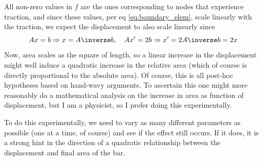 \documentclass[sigconf]{acmart}
\begin{document}
All non-zero values in $ f $ are the ones corresponding to nodes that experience traction, and since these values, per eq \ref{eq:boundary_elem}, scale linearly with the traction, we expect the displacement to also scale linearly since
\begin{equation*}\label{key}
	Ax=b \Rightarrow x = A\inverse b, \quad Ax' = 2b \Rightarrow x'=2A\inverse b = 2x
\end{equation*}
Now, area scales as the square of length, so a linear increase in the displacement might well induce a quadratic increase in the relative area (which of course is directly proportional to the absolute area). Of course, this is all post-hoc hypotheses based on hand-wavy arguments. To ascertain this one might more reasonably do a mathematical analysis on the increase in area as function of displacement, but I am a physicist, so I prefer doing this experimentally.

To do this experimentally, we need to vary as many different parameters as possible (one at a time, of course) and see if the effect still occurs. If it does, it is a strong hint in the direction of a quadratic relationship between the displacement and final area of the bar.
\end{document}
